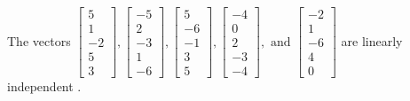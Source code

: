 \begin{exercise}
\begin{exerciseStatement}
  \end{exerciseStatement}
  \begin{exerciseAnswer}
   The vectors \(\left[\begin{array}{r}
5 \\
1 \\
-2 \\
5 \\
3
\end{array}\right] , \left[\begin{array}{r}
-5 \\
2 \\
-3 \\
1 \\
-6
\end{array}\right] , \left[\begin{array}{r}
5 \\
-6 \\
-1 \\
3 \\
5
\end{array}\right] , \left[\begin{array}{r}
-4 \\
0 \\
2 \\
-3 \\
-4
\end{array}\right] , \text{ and } \left[\begin{array}{r}
-2 \\
1 \\
-6 \\
4 \\
0
\end{array}\right]\) are 
  	 linearly independent  .
  


  \end{exerciseAnswer}
\end{exercise}